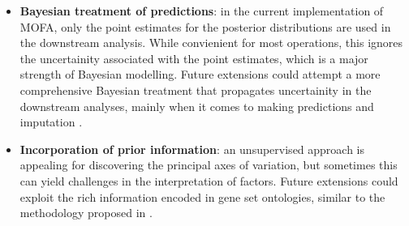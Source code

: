 \begin{itemize}

	\item \textbf{Bayesian treatment of predictions}: in the current implementation of MOFA, only the point estimates for the posterior distributions are used in the downstream analysis. While convienient for most operations, this ignores the uncertainity associated with the point estimates, which is a major strength of Bayesian modelling. Future extensions could attempt a more comprehensive Bayesian treatment that propagates uncertainity in the downstream analyses, mainly when it comes to making predictions and imputation \cite{Gelman2013}.

	\item \textbf{Incorporation of prior information}: an unsupervised approach is appealing for discovering the principal axes of variation, but sometimes this can yield challenges in the interpretation of factors. Future extensions could exploit the rich information encoded in gene set ontologies, similar to the methodology proposed in \cite{Buettner2017}.

\end{itemize}

